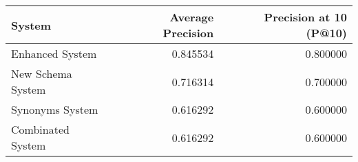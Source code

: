 \begin{tabular}{lrr}
\toprule
System & Average Precision & Precision at 10 (P@10) \\
\midrule
Enhanced System & 0.845534 & 0.800000 \\
New Schema System & 0.716314 & 0.700000 \\
Synonyms System & 0.616292 & 0.600000 \\
Combinated System & 0.616292 & 0.600000 \\
\bottomrule
\end{tabular}
